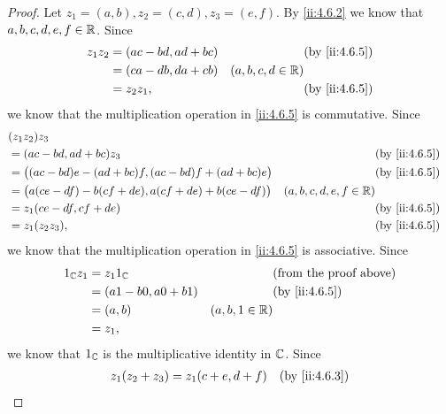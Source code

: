 \begin{proof}
  Let \(z_1 = (a, b), z_2 = (c, d), z_3 = (e, f)\).
  By \cref{ii:4.6.2} we know that \(a, b, c, d, e, f \in \mathbb{R}\).
  Since
  \begin{align*}
    z_1 z_2 & = (ac - bd, ad + bc) &                     & \by{ii:4.6.5} \\
            & = (ca - db, da + cb) & (a, b, c, d \in \R)                 \\
            & = z_2 z_1,           &                     & \by{ii:4.6.5}
  \end{align*}
  we know that the multiplication operation in \cref{ii:4.6.5} is commutative.
  Since
  \begin{align*}
     & (z_1 z_2) z_3                                                                                                \\
     & = (ac - bd, ad + bc) z_3                                         &                           & \by{ii:4.6.5} \\
     & = \big((ac - bd) e - (ad + bc) f, (ac - bd) f + (ad + bc) e\big) &                           & \by{ii:4.6.5} \\
     & = \big(a (ce - df) - b (cf + de), a (cf + de) + b (ce - df)\big) & (a, b, c, d, e, f \in \R)                 \\
     & = z_1 (ce - df, cf + de)                                         &                           & \by{ii:4.6.5} \\
     & = z_1 (z_2 z_3),                                                 &                           & \by{ii:4.6.5}
  \end{align*}
  we know that the multiplication operation in \cref{ii:4.6.5} is associative.
  Since
  \begin{align*}
    1_{\C} z_1 & = z_1 1_{\C}             &                  & \text{(from the proof above)} \\
               & = (a 1 - b 0, a 0 + b 1) &                  & \by{ii:4.6.5}                 \\
               & = (a, b)                 & (a, b, 1 \in \R)                                 \\
               & = z_1,
  \end{align*}
  we know that \(1_{\mathbb{C}}\) is the multiplicative identity in \(\mathbb{C}\).
  Since
  \begin{align*}
    z_1 (z_2 + z_3) & = z_1 (c + e, d + f)                                      &                           & \by{ii:4.6.3} \\

\end{align*}
\end{proof}

